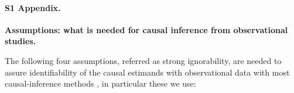 \documentclass[10pt,letterpaper]{article}
\begin{document}



\paragraph*{S1 Appendix.}
\label{apd:causal_assumptions}
{\bf Assumptions: what is needed for causal inference from observational studies.}


The following four assumptions, referred as strong ignorability, are
needed to assure identifiability of the causal estimands with observational
data with most causal-inference methods \cite{rubin2005causal}, in
particular these we use:
\end{document}
